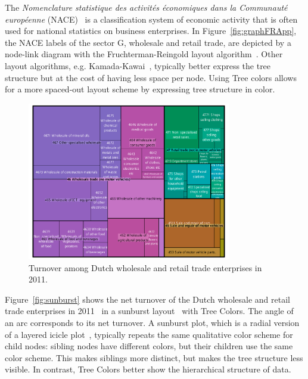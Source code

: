 \documentclass[journal]{vgtc}                %
\begin{document}
The \textit{Nomenclature statistique des activit\'es \'economiques dans la Communaut\'e europ\'eenne} (NACE)~\cite{nace} is a classification system of economic activity that is often used for national statistics on business enterprises. In Figure~\ref{fig:graphFRApp}, the NACE labels of the sector G, wholesale and retail trade, are depicted by a node-link diagram with the Fruchterman-Reingold layout algorithm~\cite{Fruchterman91}. Other layout algorithms, e.g. Kamada-Kawai~\cite{Kamada89}, typically better express the tree structure but at the cost of having less space per node. Using Tree colors allows for a more spaced-out layout scheme by expressing tree structure in color.


\begin{figure}[!b]
  \centering
  \includegraphics[width=3.5in]{TMbusiness2.pdf}
  \caption{Turnover among Dutch wholesale and retail trade enterprises in 2011.}\label{fig:treemapApp}
\end{figure}


Figure~\ref{fig:sunburst} shows the net turnover of the Dutch wholesale and retail trade enterprises in 2011~\cite{cbsSBS} in a sunburst layout~\cite{stasko2000evaluation, stasko2000focus+} with Tree Colors. The angle of an arc corresponds to its net turnover. A sunburst plot, which is a radial version of a layered icicle plot~\cite{kruskal1983icicle,burch2010indented}, typically repeats the same qualitative color scheme for child nodes: sibling nodes have different colors, but their children use the same color scheme. This makes siblings more distinct, but makes the tree structure less visible. In contrast, Tree Colors better show the hierarchical structure of data.
\end{document}
